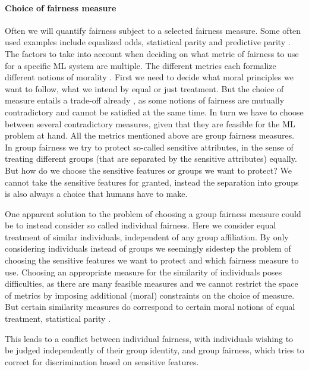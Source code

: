 	\paragraph{Choice of fairness measure}
	Often we will quantify fairness subject to a selected fairness measure.
	Some often used examples include equalized odds, statistical parity and predictive parity \cite{garg2020fairness}.
    The factors to take into account when deciding on what metric of fairness to use for a specific ML system are multiple.
	The different metrics each formalize different notions of morality \cite{binns2020apparent}.
    First we need to decide what moral principles we want to follow, \ie what we intend by equal or just treatment.
	But the choice of measure entails a trade-off already \cite{chouldechova2017fair,kleinberg2016inherent,berk2021fairness}, as some notions of fairness are mutually contradictory and cannot be satisfied at the same time.
	In turn we have to choose between several contradictory measures, given that they are feasible for the ML problem at hand.
	All the metrics mentioned above are group fairness measures.
	In group fairness we try to protect so-called sensitive attributes, in the sense of treating different groups (that are separated by the sensitive attributes) equally.
	But how do we choose the sensitive features or groups we want to protect?
	We cannot take the sensitive features for granted, instead the separation into groups is also always a choice that humans have to make.

	One apparent solution to the problem of choosing a group fairness measure could be to instead consider so called individual fairness.
	Here we consider equal treatment of similar individuals, independent of any group affiliation.
	By only considering individuals instead of groups we seemingly sidestep the problem of choosing the sensitive features we want to protect and which fairness measure to use.
	Choosing an appropriate measure for the similarity of individuals poses difficulties, as there are many feasible measures and we cannot restrict the space of metrics by imposing additional (moral) constraints on the choice of measure.
	But certain similarity measures do correspond to certain moral notions of equal treatment, \eg statistical parity \cite{dwork2012fairness}.

    This leads to a conflict between individual fairness, with individuals wishing to be judged independently of their group identity, and group fairness, which tries to correct for discrimination based on sensitive features.


